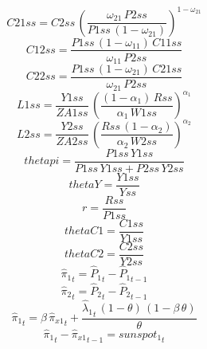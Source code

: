 \begin{dmath*}
C21ss = {C2ss}\, \left(\frac{{{\omega_{21}}}\, {P2ss}}{{P1ss}\, \left(1-{{\omega_{21}}}\right)}\right)^{1-{{\omega_{21}}}}
\end{dmath*}
\begin{dmath*}
C12ss = \frac{{P1ss}\, \left(1-{{\omega_{11}}}\right)\, {C11ss}}{{{\omega_{11}}}\, {P2ss}}
\end{dmath*}
\begin{dmath*}
C22ss = \frac{{P1ss}\, \left(1-{{\omega_{21}}}\right)\, {C21ss}}{{{\omega_{21}}}\, {P2ss}}
\end{dmath*}
\begin{dmath*}
L1ss = \frac{{Y1ss}}{{ZA1ss}}\, \left(\frac{\left(1-{{\alpha_{1}}}\right)\, {Rss}}{{{\alpha_{1}}}\, {W1ss}}\right)^{{{\alpha_{1}}}}
\end{dmath*}
\begin{dmath*}
L2ss = \frac{{Y2ss}}{{ZA2ss}}\, \left(\frac{{Rss}\, \left(1-{{\alpha_{2}}}\right)}{{{\alpha_{2}}}\, {W2ss}}\right)^{{{\alpha_{2}}}}
\end{dmath*}
\begin{dmath*}
thetapi = \frac{{P1ss}\, {Y1ss}}{{P1ss}\, {Y1ss}+{P2ss}\, {Y2ss}}
\end{dmath*}
\begin{dmath*}
thetaY = \frac{{Y1ss}}{{Yss}}
\end{dmath*}
\begin{dmath*}
r = \frac{{Rss}}{{P1ss}}
\end{dmath*}
\begin{dmath*}
thetaC1 = \frac{{C1ss}}{{Y1ss}}
\end{dmath*}
\begin{dmath*}
thetaC2 = \frac{{C2ss}}{{Y2ss}}
\end{dmath*}
\begin{dmath}
{{\hat{\pi}_{1}}}_{t}={{\hat{P}_{1}}}_{t}-{{\hat{P}_{1}}}_{t-1}
\end{dmath}
\begin{dmath}
{{\hat{\pi}_{2}}}_{t}={{\hat{P}_{2}}}_{t}-{{\hat{P}_{2}}}_{t-1}
\end{dmath}
\begin{dmath}
{{\hat{\pi}_{1}}}_{t}={{\beta}}\, {{\hat{\pi}_{x1}}}_{t}+\frac{{{\hat{\lambda}_{1}}}_{t}\, \left(1-{{\theta}}\right)\, \left(1-{{\beta}}\, {{\theta}}\right)}{{{\theta}}}
\end{dmath}
\begin{dmath}
{{\hat{\pi}_{1}}}_{t}-{{\hat{\pi}_{x1}}}_{t-1}={{sunspot_{1}}}_{t}
\end{dmath}
